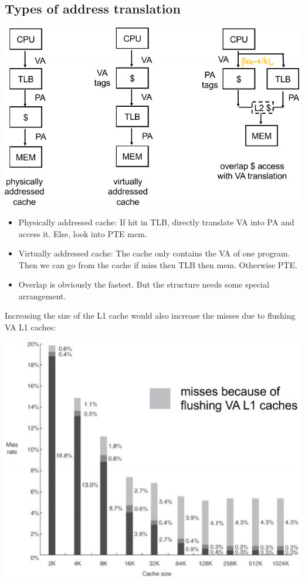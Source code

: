 \documentclass[letterpaper,12pt]{article}
\begin{document}
\subsection{Types of address translation}
\includegraphics*{./Image/Types of address translation.png}
\begin{itemize}
    \item Physically addressed cache:
          If hit in TLB, directly translate VA into PA and access it. Else, look into PTE mem.
    \item Virtually addressed cache:
          The cache only contains the VA of one program. Then we can go from the cache if miss then TLB then mem. Otherwise PTE.
    \item Overlap is obviously the fastest. But the structure needs some special arrangement.
\end{itemize}

Increasing the size of the L1 cache would also increase the misses due to flushing VA L1 caches:

\includegraphics*[scale = 0.7]{./Image/VA cache miss.png}
\end{document}
